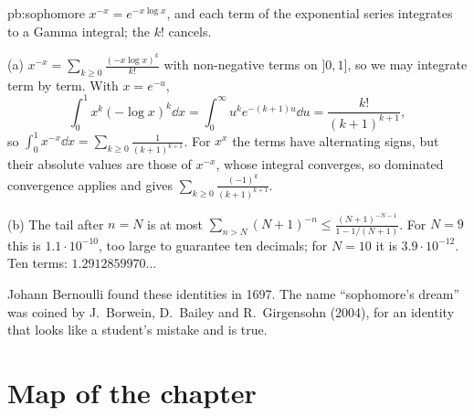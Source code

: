 \begin{solution}{pb:sophomore}
\idea $x^{-x}=e^{-x\log x}$, and each term of the exponential series integrates to a Gamma integral; the $k!$ cancels.

\writeup (a) $x^{-x}=\sum_{k\ge0}\frac{(-x\log x)^k}{k!}$ with non-negative terms on $]0,1]$, so we may integrate term by term. With $x=e^{-u}$,
\[
\int_0^1x^k(-\log x)^k\dd x=\int_0^\infty u^ke^{-(k+1)u}\dd u=\frac{k!}{(k+1)^{k+1}},
\]
so $\int_0^1x^{-x}\dd x=\sum_{k\ge0}\frac1{(k+1)^{k+1}}$. For $x^x$ the terms have alternating signs, but their absolute values are those of $x^{-x}$,
whose integral converges, so dominated convergence applies and gives $\sum_{k\ge0}\frac{(-1)^k}{(k+1)^{k+1}}$.

(b) The tail after $n=N$ is at most $\sum_{n>N}(N+1)^{-n}\le\frac{(N+1)^{-N-1}}{1-1/(N+1)}$. For $N=9$ this is $1.1\cdot10^{-10}$, too large to guarantee ten
decimals; for $N=10$ it is $3.9\cdot10^{-12}$. Ten terms: $1.2912859970\ldots$

\leads Johann Bernoulli found these identities in 1697. The name ``sophomore's dream'' was coined by J.~Borwein, D.~Bailey and
R.~Girgensohn (2004), for an identity that looks like a student's mistake and is true.
\end{solution}

\section*{Map of the chapter}

